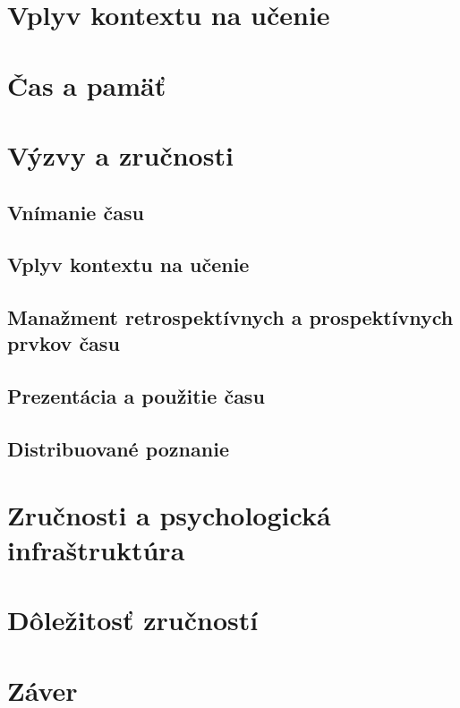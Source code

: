 \documentclass[10pt,twoside,slovak,a4paper]{article}
\begin{document}
\section{Vplyv kontextu na učenie}
\section{Čas a pamäť}
\section{Výzvy a zručnosti}
	\subsection{Vnímanie času}
	\subsection{Vplyv kontextu na učenie}
	\subsection{Manažment retrospektívnych a prospektívnych prvkov času}
	\subsection{Prezentácia a použitie času}
	\subsection{Distribuované poznanie}
\section{Zručnosti a psychologická infraštruktúra}
\section{Dôležitosť zručností}
\section{Záver}



\end{document}
